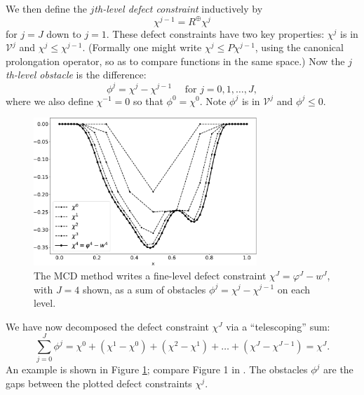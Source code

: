 \documentclass[letterpaper,final,12pt,reqno]{amsart}
\theoremstyle{claim}
\newcommand{\mR}{R^{\bm{\oplus}}}
\numberwithin{equation}{section}
\numberwithin{figure}{section}
\numberwithin{table}{section}
\numberwithin{theorem}{section}
\begin{document}
We then define the \emph{$j$th-level defect constraint} inductively by
\begin{equation}
  \chi^{j-1} = \mR \chi^j  \label{eq:chik}
\end{equation}
for $j=J$ down to $j=1$.  These defect constraints have two key properties: $\chi^j$ is in $\mathcal{V}^j$ and $\chi^j \le \chi^{j-1}$.  (Formally one might write $\chi^j \le P \chi^{j-1}$, using the canonical prolongation operator, so as to compare functions in the same space.)  Now the \emph{$j$th-level obstacle} is the difference:
\begin{equation}
  \phi^j = \chi^j - \chi^{j-1} \quad \text{ for } j=0,1,\dots,J,  \label{eq:levelobstacle}
\end{equation}
where we also define $\chi^{-1}=0$ so that $\phi^0 = \chi^0$.  Note $\phi^j$ is in $\mathcal{V}^j$ and $\phi^j\le 0$.

\begin{figure}
\includegraphics[width=0.75\textwidth]{fixfigs/decomp_defect.pdf}
\caption{The MCD method writes a fine-level defect constraint $\chi^J = \varphi^J - w^J$, with $J=4$ shown, as a sum of obstacles $\phi^j = \chi^j - \chi^{j-1}$ on each level.}
\label{fig:gooddecomposition}
\end{figure}

We have now decomposed the defect constraint $\chi^J$ via a ``telescoping'' sum:
\begin{equation}
  \sum_{j=0}^J \phi^j = \chi^0 + (\chi^1 - \chi^0) + (\chi^2 - \chi^1) + \dots + (\chi^J - \chi^{J-1}) = \chi^J.  \label{eq:telescopingdecomposition}
\end{equation}
An example is shown in Figure \ref{fig:gooddecomposition}; compare Figure 1 in \cite{GraeserKornhuber2009}.  The obstacles $\phi^j$ are the gaps between the plotted defect constraints $\chi^j$.
\end{document}
